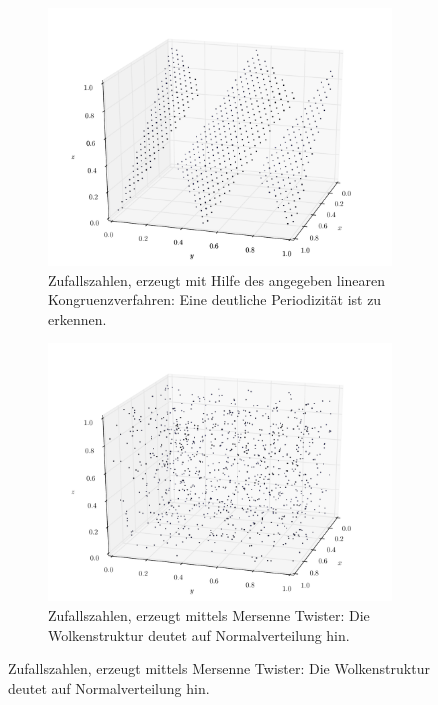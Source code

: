 \documentclass{scrartcl}
\begin{document}
\begin{figure}[H]
    \centering
    \begin{subfigure}{0.45\textwidth}
        \centering
        \includegraphics[width=\textwidth]{plots/dist3d.pdf}
        \caption{Zufallszahlen, erzeugt mit Hilfe des angegeben linearen Kongruenzverfahren: Eine deutliche Periodizität ist zu erkennen.}
        \label{fig:3DLK}
    \end{subfigure}
    \hfill
    \begin{subfigure}{0.45\textwidth}
        \centering
        \includegraphics[width=\textwidth]{plots/dist3d_mt.pdf}
        \caption{Zufallszahlen, erzeugt mittels Mersenne Twister: Die Wolkenstruktur deutet auf Normalverteilung hin.}
        \label{fig:3DMT}
    \end{subfigure}
\end{figure}
\end{document}

